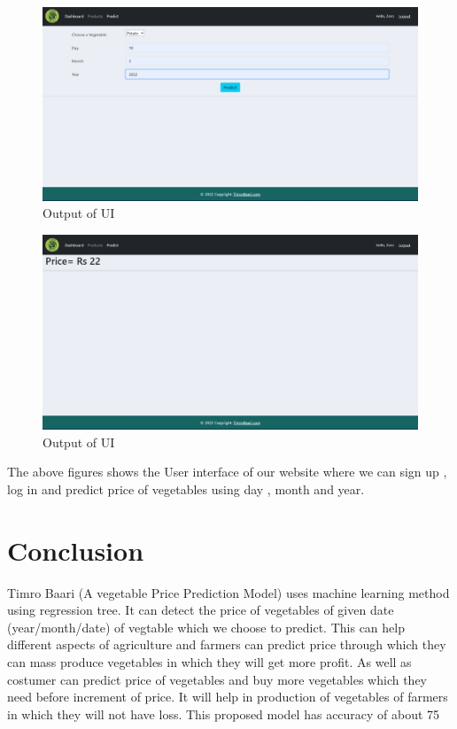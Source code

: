 \begin{figure}[H]
	\centering
	\includegraphics[width=120mm]{images/output1.png}
	\caption{Output of UI} %
	\label{figoutput1} %
\end{figure}


\begin{figure}[H]
	\centering
	\includegraphics[width=120mm]{images/output2.png}
	\caption{Output of UI} %
	\label{figoutput2} %
\end{figure}
The above figures shows the User interface of our website where we can sign up , log in and predict price of vegetables using day , month and year. 





\chapter{Conclusion}
Timro Baari (A vegetable Price Prediction Model) uses machine learning method using regression tree. It can detect the price of vegetables of given date (year/month/date) of vegtable which we choose to predict. This can help different aspects of agriculture and farmers can predict price through which they can mass produce vegetables in which they will get more profit. As well as costumer can predict price of vegetables and buy more vegetables which they need before increment of price. It will help in production of vegetables of farmers in which they will not have loss. This proposed model has accuracy of about 75%

